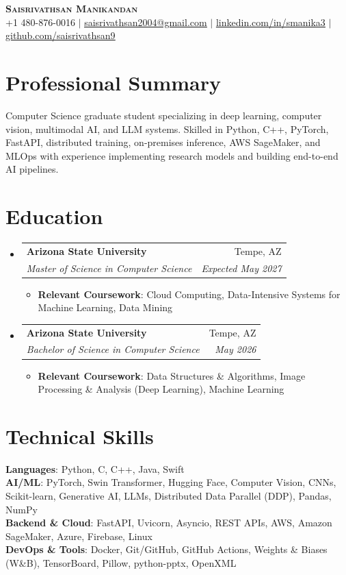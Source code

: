 \documentclass[letterpaper,11pt]{article}
\makeatletter
\newcommand{\resumeItem}[1]{
  \item\small{
    {#1 \vspace{-2pt}}
  }
}
\newcommand{\resumeSubheading}[4]{
  \vspace{-1pt}\item
    \begin{tabular*}{0.97\textwidth}[t]{l@{\extracolsep{\fill}}r}
      \textbf{#1} & #2 \\
      \textit{\small#3} & \textit{\small #4} \\
    \end{tabular*}\vspace{-7pt}
}
\newcommand{\resumeSubHeadingListStart}{\begin{itemize}[leftmargin=0.15in, label={}]}
\newcommand{\resumeSubHeadingListEnd}{\end{itemize}}
\newcommand{\resumeItemListStart}{\begin{itemize}}
\newcommand{\resumeItemListEnd}{\end{itemize}\vspace{-5pt}}
\makeatother
\begin{document}
\begin{center}
    \textbf{\Huge \scshape Saisrivathsan Manikandan} \\ \vspace{1pt}
    \small +1 480-876-0016 $|$ 
    \href{mailto:saisrivathsan2004@gmail.com}{\underline{saisrivathsan2004@gmail.com}} $|$ 
    \href{https://linkedin.com/in/smanika3}{\underline{linkedin.com/in/smanika3}} $|$
    \href{https://github.com/saisrivathsan9}{\underline{github.com/saisrivathsan9}}
\end{center}

\section{Professional Summary}
\small{Computer Science graduate student specializing in deep learning, computer vision, multimodal AI, and LLM systems. Skilled in Python, C++, PyTorch, FastAPI, distributed training, on-premises inference, AWS SageMaker, and MLOps with experience implementing research models and building end-to-end AI pipelines.}

\section{Education}
  \resumeSubHeadingListStart
    \resumeSubheading
      {Arizona State University}{Tempe, AZ}
      {Master of Science in Computer Science}{Expected May 2027}
        \resumeItemListStart
        \resumeItem{\textbf{Relevant Coursework}: Cloud Computing, Data-Intensive Systems for Machine Learning, Data Mining}
      \resumeItemListEnd

      \resumeSubheading
      {Arizona State University}{Tempe, AZ}
      {Bachelor of Science in Computer Science}{May 2026}
      \resumeItemListStart
        \resumeItem{\textbf{Relevant Coursework}: Data Structures \& Algorithms, Image Processing \& Analysis (Deep Learning), Machine Learning}
      \resumeItemListEnd
  \resumeSubHeadingListEnd

\section{Technical Skills}
 \begin{itemize}[leftmargin=0.15in, label={}]
    \small{\item{
     \textbf{Languages}: Python, C, C++, Java, Swift \\
     \textbf{AI/ML}: PyTorch, Swin Transformer, Hugging Face, Computer Vision, CNNs, Scikit-learn, Generative AI, LLMs, Distributed Data Parallel (DDP), Pandas, NumPy \\
     \textbf{Backend \& Cloud}: FastAPI, Uvicorn, Asyncio, REST APIs, AWS, Amazon SageMaker, Azure, Firebase, Linux \\
     \textbf{DevOps \& Tools}: Docker, Git/GitHub, GitHub Actions, Weights \& Biases (W\&B), TensorBoard, Pillow, python-pptx, OpenXML
    }}
 \end{itemize}
\end{document}

